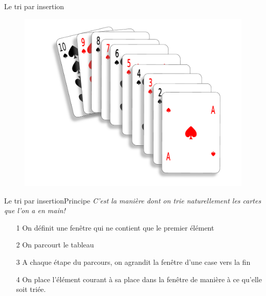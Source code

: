 \documentclass[12pt,a4paper]{beamer}
\begin{document}
\begin{frame}{Le tri par insertion}

\begin{figure}
\centering
\includegraphics[scale=0.3]{figs/insertion_cards}
\end{figure}
\end{frame}

\begin{frame}{Le tri par insertion}{Principe}
\textit{C'est la manière dont on trie naturellement les cartes que l'on a en main!
}
\begin{itemize}
\item[1]On définit une fenêtre qui ne contient que le premier élément
\item[2]On parcourt le tableau
\item[3]A chaque étape du parcours, on agrandit la fenêtre d'une case vers la fin
\item[4]On place l'élément courant à sa place dans la fenêtre de manière à ce qu'elle soit triée.
\end{itemize}

\end{frame}
\end{document}
